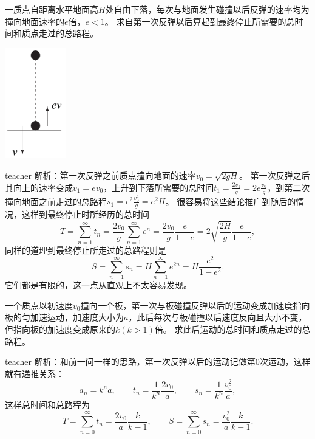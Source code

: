 \begin{example}
一质点自距离水平地面高$H$处自由下落，每次与地面发生碰撞以后反弹的速率均为撞向地面速率的$e$倍，$e<1$。
求自第一次反弹以后算起到最终停止所需要的总时间和质点走过的总路程。
\begin{flushright}
\includegraphics[width = 0.2\textwidth]{images/motion-29.pdf} 
\end{flushright}
\begin{taggedblock}{teacher}
\noindent
解析：第一次反弹之前质点撞向地面的速率$v_0 = \sqrt{2gH}$。
第一次反弹之后其向上的速率变成$v_1=ev_0$，上升到下落所需要的总时间$t_1 = \frac{2v_1}{g} = 2e\frac{v_0}{g}$，到第二次撞向地面之前走过的总路程$s_1 = e^2\frac{v_0^2}{g} = e^2H$。
很容易将这些结论推广到随后的情况，这样到最终停止时所经历的总时间
\[ T = \sum_{n=1}^\infty t_n =  \frac{2v_0}{g}\sum_{n=1}^\infty e^n = \frac{2v_0}{g} \frac{e}{1-e}  = 2 \sqrt{ \frac{2H}{g}} \frac{e}{1-e},\]
同样的道理到最终停止所走过的总路程则是
\[  S = \sum_{n=1}^\infty s_n =  H \sum_{n=1}^\infty e^{2n} = H\frac{e^2}{1-e^2}.\]
它们都是有限的，这一点从直观上不太容易发现。
\end{taggedblock}
\end{example}


\begin{example}
一个质点以初速度$v_0$撞向一个板，第一次与板碰撞反弹以后的运动变成加速度指向板的匀加速运动，加速度大小为$a$，此后每次与板碰撞以后速度反向且大小不变，但指向板的加速度变成原来的$k(k>1)$倍。
求此后运动的总时间和质点走过的总路程。
\begin{taggedblock}{teacher}
\newline
解析：和前一问一样的思路，第一次反弹以后的运动记做第0次运动，这样就有递推关系：
\[  a_n = k^na,\qquad t_n = \frac{1}{k^n}\frac{2v_0}{a},\qquad s_n = \frac{1}{k^n}\frac{v_0^2}{a},\]
这样总时间和总路程为
\[
T = \sum_{n=0}^\infty t_n = \frac{2v_0}{a}\frac{k}{k-1},\qquad S = \sum_{n=0}^\infty s_n = \frac{v_0^2}{a}\frac{k}{k-1}.
\]
\end{taggedblock}
\end{example}

